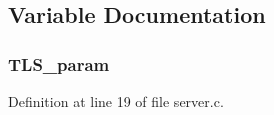 \subsection{Variable Documentation}
\subsubsection[{T\+L\+S\+\_\+param}]{ T\+L\+S\+\_\+param}\label{server_8c_a0e7739cf1f8b6bfdfe317a7bc6a56877}


Definition at line 19 of file server.\+c.

